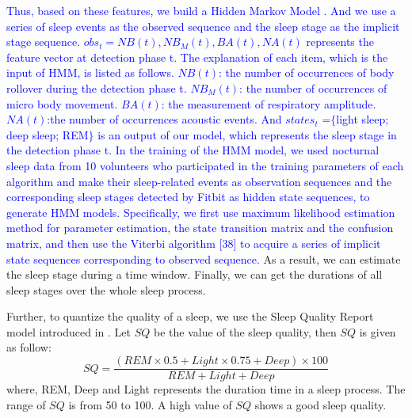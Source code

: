 \textcolor{blue}{Thus, based on these features, we build a Hidden Markov Model \cite{johnson2010hidden}. And we use a series of sleep events as the observed sequence and the sleep stage as the implicit stage sequence. $obs_t={NB(t),NB_M(t),BA(t),NA(t)}$ represents the feature vector at detection phase t. The explanation of each item, which is the input of HMM, is listed as follows. $NB(t)$: the number of occurrences of body rollover during the detection phase t. $NB_M(t)$: the number of occurrences of micro body movement. $BA(t)$: the measurement of  respiratory amplitude. $NA(t)$:the number of occurrences acoustic events. And $states_t$ =$\{$light sleep; deep sleep; REM$\}$ is an output of our model, which represents the sleep stage in the detection phase t. In the training of the HMM model, we used nocturnal sleep data from 10 volunteers who participated in the training parameters of each algorithm and make their sleep-related events as observation sequences and the corresponding sleep stages detected by Fitbit as hidden state sequences, to generate HMM models. Specifically, we first use maximum likelihood estimation method for parameter estimation, the state transition matrix and the confusion matrix, and then use the Viterbi algorithm [38] to acquire a series of implicit state sequences corresponding to observed sequence.} As a result, we can estimate the sleep stage during a time window. Finally, we can get the durations of all sleep stages over the whole sleep process.

Further, to quantize the quality of a sleep, we use the Sleep Quality Report model introduced in \cite{gu2016sleep}. Let $SQ$ be the value of the sleep quality, then $SQ$ is given as follow:
 \begin{equation}
SQ=\frac{(REM \times 0.5+Light \times 0.75+Deep) \times 100}{REM+Light+Deep}
 \end{equation}
where, REM, Deep and Light represents the duration time in a sleep process. The range of $SQ$ is from 50 to 100. A high value of $SQ$ shows a good  sleep quality.

